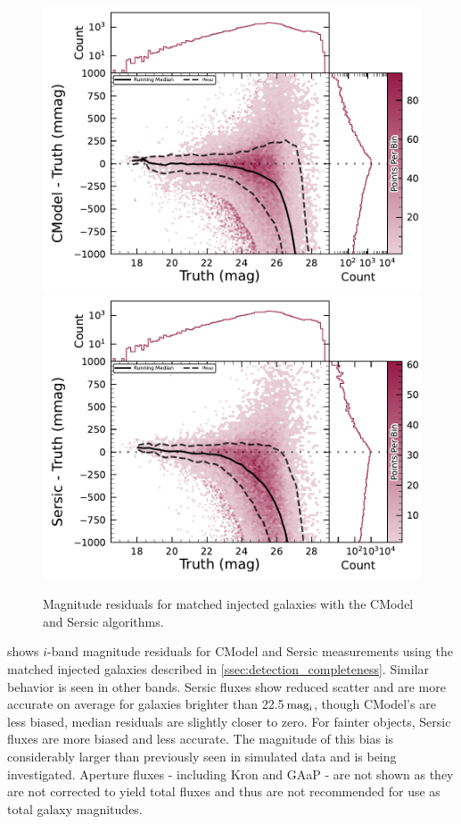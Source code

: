 \begin{figure}[htb]
\centering
\includegraphics[width=0.98\linewidth]{figures/injected_lsst_cells_v1_5063_i_mag_cmodel.pdf}
\includegraphics[width=0.98\linewidth]{figures/injected_lsst_cells_v1_5063_i_mag_sersic.pdf}
\caption{Magnitude residuals for matched injected galaxies with the CModel and Sersic algorithms.}
\label{fig:injected_lsst_cells_v1_5063_i_mag}
\vspace{0.1cm}
\end{figure}

 shows $i$-band magnitude residuals for CModel and Sersic measurements using the matched injected galaxies described in \ref{ssec:detection_completeness}.
Similar behavior is seen in other bands.
Sersic fluxes show reduced scatter and are more accurate on average for galaxies brighter than 22.5\,${\rm mag_{i}}$, though CModel's are less biased, median residuals are slightly closer to zero.
For fainter objects, Sersic fluxes are more biased and less accurate.
The magnitude of this bias is considerably larger than previously seen in simulated data and is being investigated.
Aperture fluxes - including Kron and GAaP - are not shown as they are not corrected to yield total fluxes and thus are not recommended for use as total galaxy magnitudes.

